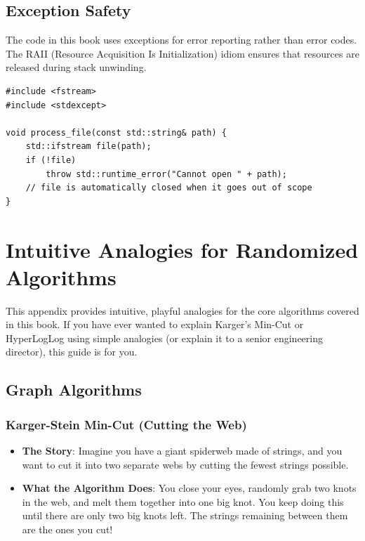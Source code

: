 \documentclass[twoside,12pt]{book}
\theoremstyle{plain}
\theoremstyle{definition}
\theoremstyle{remark}
\begin{document}
\section{Exception Safety}
\label{app:sec:exceptions}

The code in this book uses exceptions for error reporting rather than
error codes. The RAII (Resource Acquisition Is Initialization) idiom
ensures that resources are released during stack unwinding.

\begin{lstlisting}[caption={Exception-safe resource management}]
#include <fstream>
#include <stdexcept>

void process_file(const std::string& path) {
    std::ifstream file(path);
    if (!file)
        throw std::runtime_error("Cannot open " + path);
    // file is automatically closed when it goes out of scope
}
\end{lstlisting}

\chapter{Intuitive Analogies for Randomized Algorithms}
\label{app:eli5}

This appendix provides intuitive, playful analogies for the core algorithms covered
in this book. If you have ever wanted to explain Karger's Min-Cut or HyperLogLog using 
simple analogies (or explain it to a senior engineering director), this guide is for you.

\section{Graph Algorithms}

\subsection{Karger-Stein Min-Cut (Cutting the Web)}
\begin{itemize}
    \item \textbf{The Story}: Imagine you have a giant spiderweb made of strings, and you want to cut it into two separate webs by cutting the fewest strings possible.
    \item \textbf{What the Algorithm Does}: You close your eyes, randomly grab two knots in the web, and melt them together into one big knot. You keep doing this until there are only two big knots left. The strings remaining between them are the ones you cut!
\end{itemize}
\end{document}
